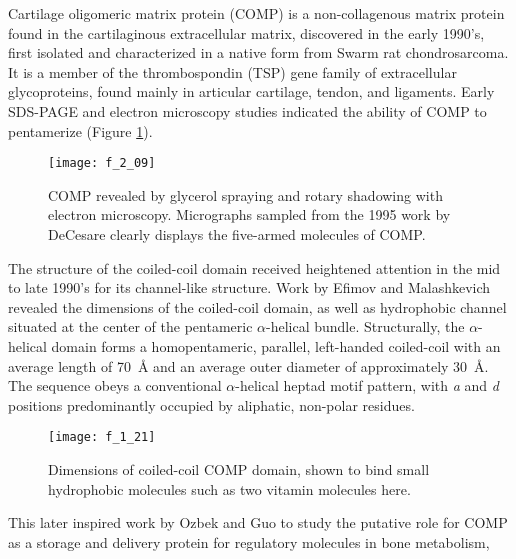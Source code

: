 \begin{refsection}
Cartilage oligomeric matrix protein (COMP) is a non-collagenous matrix protein
found in the cartilaginous extracellular matrix, discovered in the early 1990's,
first isolated and characterized in a native form from Swarm rat
chondrosarcoma.\cite{Morgelin1992} It is a member of the thrombospondin (TSP)
gene family of extracellular glycoproteins, found mainly in articular cartilage,
tendon, and
ligaments.\cite{Adams2001,Smith1997,Muller1998,Hedbom1992,Oldberg1992} Early
SDS-PAGE and electron microscopy studies indicated the ability of COMP to
pentamerize (Figure \ref{fig:COMP_EM_1}).\cite{DiCesare1995,Morgelin1992} 
\begin{figure}[h!] \centering \texttt{[image: f\_2\_09]}
    \caption[COMP revealed by glycerol spraying and rotary shadowing with
    electron microscopy.]{COMP revealed by glycerol spraying and rotary
        shadowing with electron microscopy. Micrographs sampled from the 1995
        work by DeCesare  clearly displays the five-armed
        molecules of COMP.\cite{DiCesare1995}}\label{fig:COMP_EM_1} \end{figure}
The structure of the coiled-coil domain received heightened attention in the mid
to late 1990's for its channel-like structure. Work by Efimov and Malashkevich
revealed the dimensions of the coiled-coil domain, as well as hydrophobic
channel situated at the center of the pentameric ${\alpha}$-helical
bundle.\cite{Efimov1996,Malashkevich1996a} Structurally, the ${\alpha}$-helical
domain forms a homopentameric, parallel, left-handed coiled-coil with an average
length of \SI{70}{\angstrom} and an average outer diameter of approximately
\SI{30}{\angstrom}. The sequence obeys a conventional ${\alpha}$-helical heptad
motif pattern, with \emph{a} and \emph{d} positions predominantly occupied by
aliphatic, non-polar residues.\cite{Burkhard2001} 
\begin{figure}[h!] \centering \texttt{[image: f\_1\_21]}
    \caption[Dimensions of coiled-coil COMP domain, shown to bind small
    hydrophobic molecules such as two vitamin  molecules
here.]{Dimensions of coiled-coil COMP domain, shown to bind small hydrophobic
    molecules such as two vitamin  molecules
    here.\cite{Ozbek2002}}\label{fig:comp_dimensions}
\end{figure}
This later inspired work by Ozbek and Guo to study the putative role for COMP as
a storage and delivery protein for regulatory molecules in bone metabolism,

\end{refsection}
